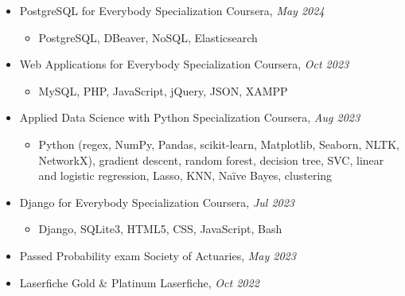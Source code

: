 \documentclass[a4paper,11pt]{article}
\newcommand{\header} [1] {
    \vspace{1mm}
    {\textsc{\textbf{\Large{\xrfill[0.5ex]{0.5pt}~#1~\xrfill[0.5ex]{0.5pt}}}}} %
}
\begin{document}
\begin{itemize}
    \item PostgreSQL for Everybody Specialization \hfill Coursera, \textit{May 2024}
    \begin{itemize}
        \item PostgreSQL, DBeaver, NoSQL, Elasticsearch
    \end{itemize}
    \item Web Applications for Everybody Specialization \hfill Coursera, \textit{Oct 2023}
    \begin{itemize}
        \item MySQL, PHP, JavaScript, jQuery, JSON, XAMPP
    \end{itemize}
    \item Applied Data Science with Python Specialization \hfill Coursera, \textit{Aug 2023}
    \begin{itemize}
        \item Python (regex, NumPy, Pandas, scikit-learn, Matplotlib, Seaborn, NLTK, NetworkX), gradient descent, random forest, decision tree, SVC, linear and logistic regression, Lasso, KNN, Na\"{i}ve Bayes, clustering
    \end{itemize}
    \item Django for Everybody Specialization \hfill Coursera, \textit{Jul 2023}
    \begin{itemize}
        \item Django, SQLite3, HTML5, CSS, JavaScript, Bash
    \end{itemize}
    \item Passed Probability exam \hfill Society of Actuaries, \textit{May 2023}
    \item Laserfiche Gold \& Platinum \hfill Laserfiche, \textit{Oct 2022}
\end{itemize}

\vspace{1mm}


\end{document}
